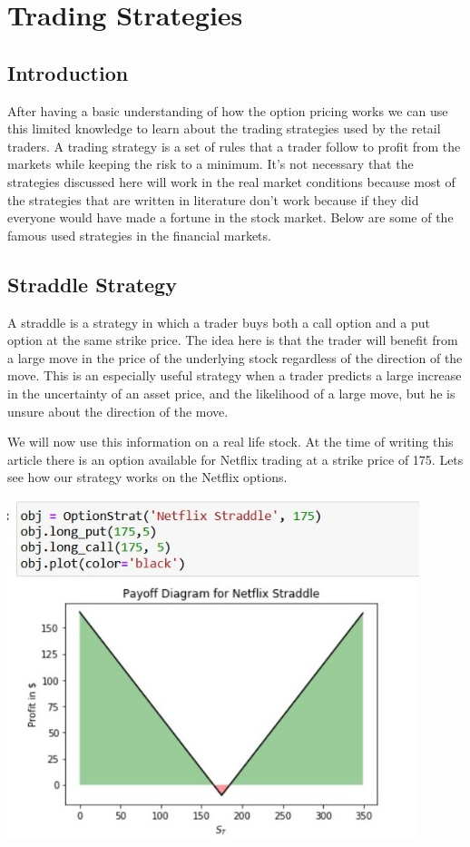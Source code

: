 \documentclass[12pt]{article}
\begin{document}
	\section{Trading Strategies}
	\subsection{Introduction}
	After having a basic understanding of how the option pricing works we can use this limited knowledge to learn about the trading strategies used by the retail traders.
	A trading strategy is a set of rules that a trader follow to profit from the markets while keeping the risk to a minimum. It's not necessary that the strategies discussed here will work in the real market conditions because most of the strategies that are written in literature don't work because if they did everyone would have made a fortune in the stock market. Below are some of the famous used strategies in the financial markets.
	
	\subsection{Straddle Strategy}
	A straddle is a strategy in which a trader buys both a call option and a put option at the same strike price. The idea here is that the trader will benefit from a large move in the price of the underlying stock regardless of the direction of the move. This is an especially useful strategy when a trader predicts a large increase in the uncertainty of an asset price, and the likelihood of a large move, but he is unsure about the direction of the move.
	
	We will now use this information on a real life stock. At the time of writing this article there is an option available for Netflix trading at a strike price of 175. Lets see how our strategy works on the Netflix options. \cite{bwordl3}
	
	\includegraphics[width=12cm]{straddle}
	
\end{document}
